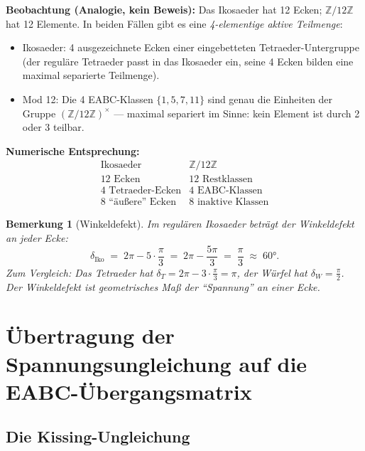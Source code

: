 \documentclass[12pt,a4paper]{article}
\newtheorem{bemerkung}[definition]{Bemerkung}
\newcommand{\Z}{\mathbb{Z}}
\newcommand{\ZmZ}{\Z/12\Z}
\begin{document}
\begin{tcolorbox}[analogie]
\textbf{Beobachtung (Analogie, kein Beweis):}
Das Ikosaeder hat 12 Ecken; $\ZmZ$ hat 12 Elemente.
In beiden Fällen gibt es eine \emph{4-elementige aktive Teilmenge}:
\begin{itemize}[noitemsep]
  \item Ikosaeder: 4 ausgezeichnete Ecken einer eingebetteten Tetraeder-Untergruppe
        (der reguläre Tetraeder passt in das Ikosaeder ein, seine 4 Ecken
        bilden eine maximal separierte Teilmenge).
  \item Mod 12: Die 4 EABC-Klassen $\{1, 5, 7, 11\}$ sind genau die
        Einheiten der Gruppe $(\Z/12\Z)^\times$ --- maximal separiert im
        Sinne: kein Element ist durch 2 oder 3 teilbar.
\end{itemize}

\medskip
\textbf{Numerische Entsprechung:}
\[
  \begin{array}{c|c}
  \text{Ikosaeder} & \ZmZ \\ \hline
  12 \text{ Ecken} & 12 \text{ Restklassen} \\
  4 \text{ Tetraeder-Ecken} & 4 \text{ EABC-Klassen} \\
  8 \text{ ``äußere'' Ecken} & 8 \text{ inaktive Klassen}
  \end{array}
\]
\end{tcolorbox}

\begin{bemerkung}[Winkeldefekt]
\label{bem:winkeldefekt}
Im regulären Ikosaeder beträgt der Winkeldefekt an jeder Ecke:
\[
  \delta_{\text{Iko}} \;=\; 2\pi - 5 \cdot \frac{\pi}{3}
  \;=\; 2\pi - \frac{5\pi}{3}
  \;=\; \frac{\pi}{3} \;\approx\; 60°.
\]
Zum Vergleich: Das Tetraeder hat $\delta_T = 2\pi - 3 \cdot \frac{\pi}{3} = \pi$,
der Würfel hat $\delta_W = \frac{\pi}{2}$.
Der Winkeldefekt ist geometrisches Maß der ``Spannung'' an einer Ecke.
\end{bemerkung}

\section{Übertragung der Spannungsungleichung auf die EABC-Übergangsmatrix}
\label{sec:transfer}

\subsection{Die Kissing-Ungleichung}
\end{document}
